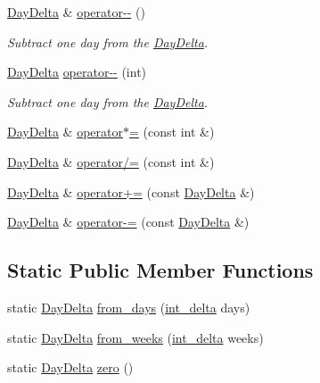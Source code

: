 \begin{DoxyCompactItemize}
\hyperlink{structDayDelta}{\-Day\-Delta} \& \hyperlink{structDayDelta_aa0ca3c6a73df1946150a1c7e555b79b9}{operator-\/-\/} ()
\begin{DoxyCompactList}\small\item\em \-Subtract one day from the \hyperlink{structDayDelta}{\-Day\-Delta}. \end{DoxyCompactList}\item 
\hyperlink{structDayDelta}{\-Day\-Delta} \hyperlink{structDayDelta_a7e0ffb0cc2aeff7414fee2edfb8e3424}{operator-\/-\/} (int)
\begin{DoxyCompactList}\small\item\em \-Subtract one day from the \hyperlink{structDayDelta}{\-Day\-Delta}. \end{DoxyCompactList}\item 
\hyperlink{structDayDelta}{\-Day\-Delta} \& \hyperlink{structDayDelta_ac8af8f0ee6001377aac49a5620a9f200}{operator$\ast$=} (const int \&)
\item 
\hyperlink{structDayDelta}{\-Day\-Delta} \& \hyperlink{structDayDelta_a06fe33615accc5c07c9d7c79e1c2e92f}{operator/=} (const int \&)
\item 
\hyperlink{structDayDelta}{\-Day\-Delta} \& \hyperlink{structDayDelta_acb705c5865b8439db80762adf0c45f13}{operator+=} (const \hyperlink{structDayDelta}{\-Day\-Delta} \&)
\item 
\hyperlink{structDayDelta}{\-Day\-Delta} \& \hyperlink{structDayDelta_a9f12d06900c7480bdf21b5f27d1eaeef}{operator-\/=} (const \hyperlink{structDayDelta}{\-Day\-Delta} \&)
\end{DoxyCompactItemize}
\subsection*{\-Static \-Public \-Member \-Functions}
\begin{DoxyCompactItemize}
\item 
static \hyperlink{structDayDelta}{\-Day\-Delta} \hyperlink{structDayDelta_a7421a2d8448dd7d5329d72d0d6a04cbd}{from\-\_\-days} (\hyperlink{types_8h_a10729255b1946fd4fb654b2fe814910b}{int\-\_\-delta} days)
\item 
static \hyperlink{structDayDelta}{\-Day\-Delta} \hyperlink{structDayDelta_a871bbf34275016d74c7ef8c8777c3258}{from\-\_\-weeks} (\hyperlink{types_8h_a10729255b1946fd4fb654b2fe814910b}{int\-\_\-delta} weeks)
\item 
static \hyperlink{structDayDelta}{\-Day\-Delta} \hyperlink{structDayDelta_acfcc09473305041a930a1ea6a3c20409}{zero} ()
\end{DoxyCompactItemize}
